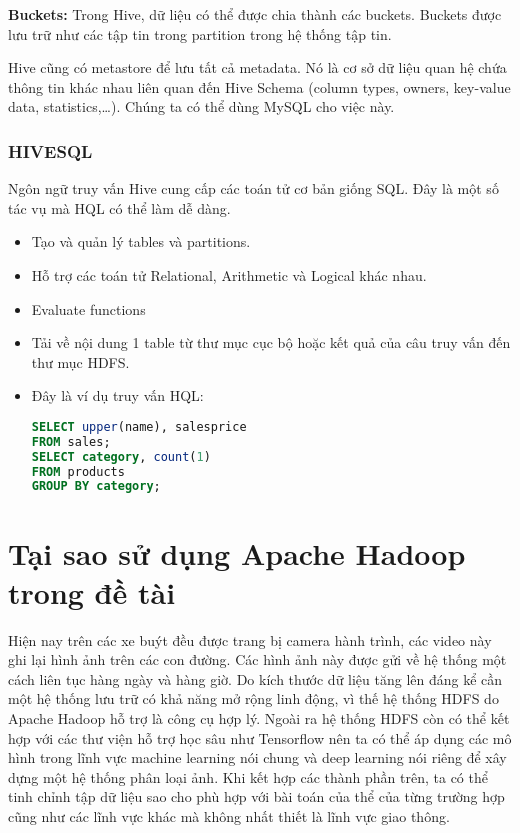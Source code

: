 \textbf{Buckets:} Trong Hive, dữ liệu có thể được chia thành các buckets. Buckets được lưu trữ như các tập tin trong partition trong hệ thống tập tin.\par
Hive cũng có metastore để lưu tất cả metadata. Nó là cơ sở dữ liệu quan hệ chứa thông tin khác nhau liên quan đến Hive Schema (column types, owners, key-value data, statistics,…). Chúng ta có thể dùng MySQL cho việc này.
\subsubsection{HIVESQL}
Ngôn ngữ truy vấn Hive cung cấp các toán tử cơ bản giống SQL. Đây là một số tác vụ mà HQL có thể làm dễ dàng.
\begin{itemize}
	\item Tạo và quản lý tables và partitions.
	\item Hỗ trợ các toán tử Relational, Arithmetic và Logical khác nhau.
	\item Evaluate functions
	\item Tải về nội dung 1 table từ thư mục cục bộ hoặc kết quả của câu truy vấn đến thư mục HDFS.
	\item Đây là ví dụ truy vấn HQL:
	\begin{lstlisting}[language=SQL]
SELECT upper(name), salesprice 
FROM sales; 
SELECT category, count(1) 
FROM products 
GROUP BY category;

	\end{lstlisting}
\end{itemize}
\section{ Tại sao sử dụng Apache Hadoop trong đề tài}
Hiện nay trên các xe buýt đều được trang bị camera hành trình, các video này ghi lại hình ảnh trên các con đường. Các hình ảnh này được gửi về hệ thống một cách liên tục hàng ngày và hàng giờ. Do kích thước dữ liệu tăng lên đáng kể cần một hệ thống lưu trữ có khả năng mở rộng linh động, vì thế hệ thống HDFS do Apache Hadoop hỗ trợ là công cụ hợp lý. Ngoài ra hệ thống HDFS còn có thể kết hợp với các thư viện hỗ trợ học sâu như Tensorflow nên ta có thể áp dụng các mô hình trong lĩnh vực machine learning nói chung và deep learning nói riêng để xây dựng một hệ thống phân loại ảnh. Khi kết hợp các thành phần trên, ta có thể tinh chỉnh tập dữ liệu sao cho phù hợp với bài toán của thể của từng trường hợp cũng như các lĩnh vực khác mà không nhất thiết là lĩnh vực giao thông.
